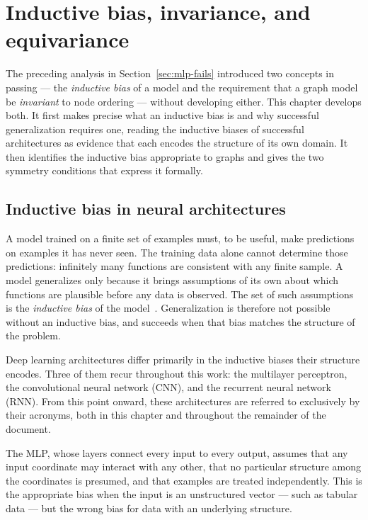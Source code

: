 \chapter{Inductive bias, invariance, and equivariance}
\label{ch:inductive-bias}
\minitoc

The preceding analysis in Section~\ref{sec:mlp-fails} introduced two concepts
in passing — the \textit{inductive bias} of a model and the requirement that a
graph model be \textit{invariant} to node ordering — without developing either.
This chapter develops both. It first makes precise what an inductive bias is
and why successful generalization requires one, reading the inductive biases of
successful architectures as evidence that each encodes the structure of its own
domain. It then identifies the inductive bias appropriate to graphs and gives
the two symmetry conditions that express it formally.

\section{Inductive bias in neural architectures}
\label{sec:inductive-bias}

A model trained on a finite set of examples must, to be useful, make
predictions on examples it has never seen. The training data alone cannot
determine those predictions: infinitely many functions are consistent with any
finite sample. A model generalizes only because it brings assumptions of its
own about which functions are plausible before any data is observed.
The set of such assumptions is the \textit{inductive bias} of the
model~\cite{goodfellow2016}. Generalization is therefore not possible without
an inductive bias, and succeeds when that bias matches the structure of the
problem.

Deep learning architectures differ primarily in the inductive biases their
structure encodes. Three of them recur throughout 
this work: the multilayer perceptron, the convolutional neural network (CNN), 
and the recurrent neural network (RNN). From this point onward, these architectures 
are referred to exclusively by their acronyms, both in this chapter and 
throughout the remainder of the document.

The MLP, whose layers connect every input to every output, assumes that any
input coordinate may interact with any other, that no particular structure 
among the coordinates is presumed, and that examples are treated 
independently. This is the appropriate bias when the input is an
unstructured vector — such as tabular data — but the wrong bias for 
data with an underlying structure.

